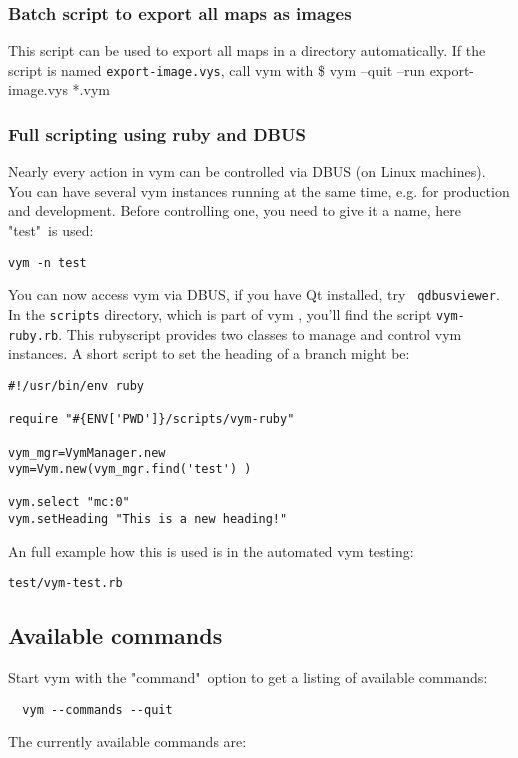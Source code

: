 \documentclass[12pt,a4paper]{article}
\newcommand{\vym}{{\sc vym }}
\newenvironment{code}[1] { \verbatim #1}{\endverbatim  }
\begin{document}
\begin{appendix}
\subsubsection{Batch script to export all maps as images}
This script can be used to export all maps in a directory
automatically. If the script is named {\tt export-image.vys}, call \vym
with
\begin{code}
\$ vym --quit --run export-image.vys *.vym
\end{code}

\subsubsection{Full scripting using ruby and DBUS} \label{dbus}
Nearly every action in \vym can be controlled via DBUS (on Linux
machines). You can have several \vym instances running at the same time,
e.g. for production and development. Before controlling one, you need to
give it a name, here "test"\ is used:
\begin{verbatim}
vym -n test
\end{verbatim}
You can now access \vym via DBUS, if you have Qt installed, try {\tt
qdbusviewer}. In the {\tt scripts} directory, which is part of \vym,
you'll find the script {\tt vym-ruby.rb}. This rubyscript provides two
classes to manage and control \vym instances. A short script to set the
heading of a branch might be:
\begin{verbatim}
#!/usr/bin/env ruby

require "#{ENV['PWD']}/scripts/vym-ruby"

vym_mgr=VymManager.new
vym=Vym.new(vym_mgr.find('test') )

vym.select "mc:0"
vym.setHeading "This is a new heading!"
\end{verbatim}

An full example how this is
used is in the automated \vym testing:
\begin{verbatim}
test/vym-test.rb
\end{verbatim}

\subsection{Available commands}
Start vym with the "command"\ option to get a listing of available
commands:
\begin{verbatim}
  vym --commands --quit
\end{verbatim}
The currently available commands are:
\begin{itemize}
    
\end{itemize}




\end{appendix}
\end{document}
